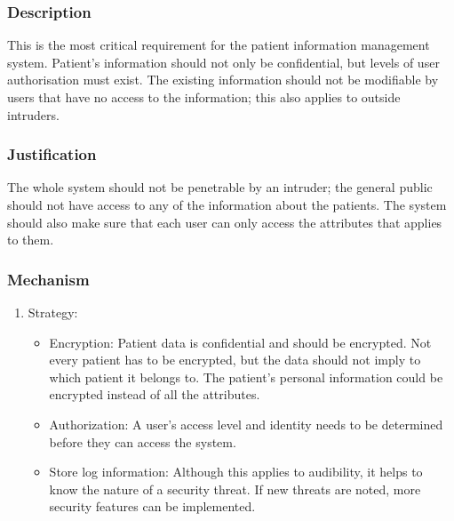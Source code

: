 \subsubsection *{Description}
This is the most critical requirement for the patient information management system. Patient's information should not only be 
confidential, but levels of user authorisation must exist. The existing information should not be modifiable by users that have no 
access to the information; this also applies to outside intruders.
\subsubsection*{Justification}
The whole system should not be penetrable by an intruder; the general public should not have access to any of the information about the patients. The system should also make sure that each user can only access the attributes that applies to them.
\subsubsection*{Mechanism}
	\begin{enumerate}
		\item Strategy:
		
		 	\begin{itemize}
		 	\item Encryption: Patient data is confidential and should be encrypted. Not every patient has to be encrypted, but 
		 	the data should not imply to which patient it belongs to. The patient's personal information could be encrypted instead 			of all the attributes.
		 	\item Authorization: A user's access level and identity needs to be determined before they can access the system. 
		 	\item Store log information: Although this applies to audibility, it helps to know the nature of a security threat.   					If new threats are noted, more security features can be implemented.
		 	\end{itemize}

	\end{enumerate}